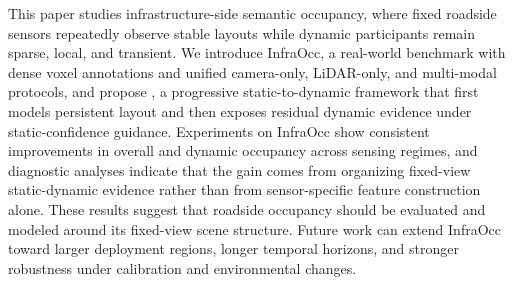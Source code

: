 This paper studies infrastructure-side semantic occupancy, where fixed
roadside sensors repeatedly observe stable layouts while dynamic participants
remain sparse, local, and transient. We introduce InfraOcc, a real-world
benchmark with dense voxel annotations and unified camera-only, LiDAR-only, and
multi-modal protocols, and propose \nameplus{}, a progressive static-to-dynamic
framework that first models persistent layout and then exposes residual dynamic
evidence under static-confidence guidance. Experiments on InfraOcc show
consistent improvements in overall and dynamic occupancy across sensing
regimes, and diagnostic analyses indicate that the gain comes from organizing
fixed-view static-dynamic evidence rather than from sensor-specific feature
construction alone. These results suggest that roadside occupancy should be
evaluated and modeled around its fixed-view scene structure. Future work can
extend InfraOcc toward larger deployment regions, longer temporal horizons, and
stronger robustness under calibration and environmental changes.
